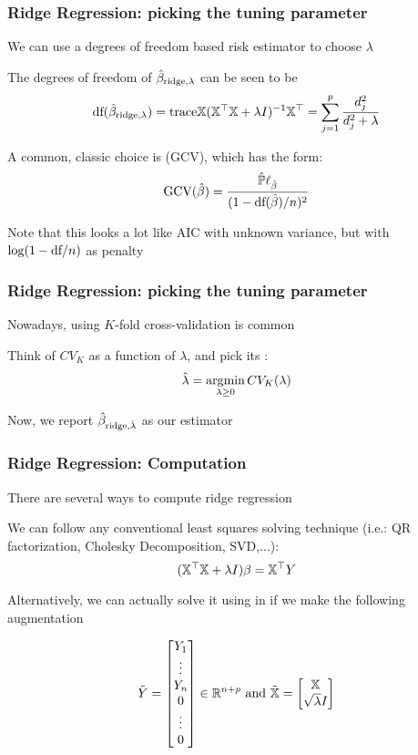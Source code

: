 \documentclass{beamer}
\begin{document}
\begin{frame}[fragile]
\frametitle{Ridge Regression: picking the tuning parameter}
We can use a degrees of freedom based risk estimator to choose $\lambda$

\vsp
The degrees of freedom of $\hat{\beta}_{\textrm{ridge},\lambda}$ can be seen to be\Note
\[
\textrm{df}(\hat{\beta}_{\textrm{ridge},\lambda}) = \textrm{trace} \mathbb{X}(\mathbb{X}^{\top}\mathbb{X} + \lambda I)^{-1} \mathbb{X}^{\top} = \sum_{j=1}^p \frac{d_j^2}{d_j^2 + \lambda}
\]

A common, classic choice is  (GCV), which has the form:
\[
\textrm{GCV}(\hat\beta) = \frac{\hat{\mathbb{P}} \ell_{\hat{\beta}}}{(1-\textrm{df}(\hat{\beta})/n)^2}
\]


\vsp
Note that this looks a lot like AIC with unknown variance, but with $\log(1- \textrm{df}{}/n)$ as penalty
\end{frame}


\begin{frame}[fragile]
\frametitle{Ridge Regression: picking the tuning parameter}
Nowadays, using $K$-fold cross-validation is common

\vsp
Think of $CV_K$ as a function of $\lambda$, and pick its :
\[
\hat\lambda = \operatorname*{\arg\!\min}_{\lambda \geq 0} CV_K(\lambda)
\]
\vsp

Now, we report $\hat{\beta}_{\textrm{ridge},\hat\lambda}$ as our estimator
\end{frame}


\begin{frame}[fragile]
\frametitle{Ridge Regression: Computation}
There are several ways to compute ridge regression

\vsp
We can follow any conventional least squares solving technique (i.e.: QR factorization, Cholesky Decomposition, SVD,...):
\[
(\mathbb{X}^{\top}\mathbb{X} + \lambda I)\beta = \mathbb{X}^{\top}Y
\]
\vsp

Alternatively, we can actually solve it using  in  if we make the following augmentation

\[
\tilde{Y} = 
\begin{bmatrix}
Y_1 \\
\vdots \\
Y_n \\
0 \\
\vdots \\
0
\end{bmatrix}
\in
\mathbb{R}^{n + p}
\textrm{ and }
\tilde{\mathbb{X}} = 
\begin{bmatrix}
\mathbb{X} \\
\sqrt{\lambda} I 
\end{bmatrix}
\]
\end{frame}
\end{document}
